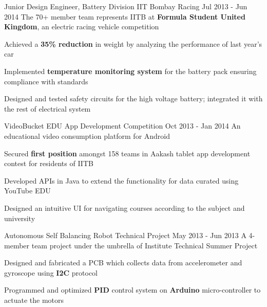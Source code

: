 \begin{cventries}
%
%
\cventrylong
{Junior Design Engineer, Battery Division} %
{IIT Bombay Racing} %
{Jul 2013 - Jun 2014} %
{The 70+ member team represents IITB at \textbf{Formula Student United Kingdom}, an electric racing vehicle competition} %
{ %
    \begin{cvitems}
        \item {Achieved a \textbf{35\% reduction} in weight by analyzing the performance of last year's car}
        \item {Implemented \textbf{temperature monitoring system} for the battery pack ensuring compliance with standards}
        \item {Designed and tested safety circuits for the high voltage battery; integrated it with the rest of electrical system}
    \end{cvitems}
}
\projectentry
{VideoBucket EDU} %
{App Development Competition} %
{} %
{Oct 2013 - Jan 2014} %
{An educational video consumption platform for Android} %
{ %
\begin{cvitems}
\item {Secured \textbf{first position} amongst 158 teams in Aakash tablet app development contest for residents of IITB}
\item {Developed APIs in Java to extend the functionality for data curated using YouTube EDU}
\item {Designed an intuitive UI for navigating courses according to the subject and university}
\end{cvitems}
}
\projectentry
{Autonomous Self Balancing Robot} %
{Technical Project} %
{} %
{May 2013 - Jun 2013} %
{A 4-member team project under the umbrella of Institute Technical Summer Project} %
{ %
    \begin{cvitems}
        \item {Designed and fabricated a PCB which collects data from accelerometer and gyroscope using \textbf{I2C} protocol}
        \item {Programmed and optimized \textbf{PID} control system on \textbf{Arduino} micro-controller to actuate the motors}
    \end{cvitems}
}
\end{cventries}
